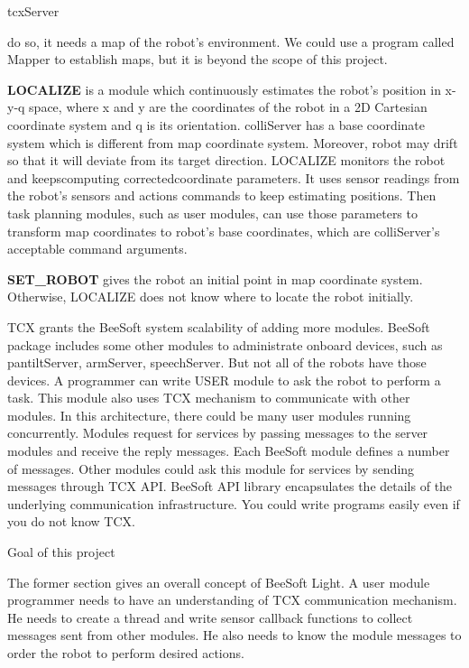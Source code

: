 \begin{itemize}{\bf \item
    tcxServer}
  do so, it needs a map of the robot's environment.  We could use a
  program called Mapper to establish maps, but it is beyond the scope
  of this project.\item {\bf LOCALIZE }is a module which continuously
  estimates the robot's position in x-y-q space, where x and y are the
  coordinates of the robot in a 2D Cartesian coordinate system and q
  is its orientation. colliServer has a base coordinate system which
  is different from map coordinate system. Moreover, robot may drift
  so that it will deviate from its target direction. LOCALIZE monitors
  the robot and keeps{\bf }computing corrected{\bf }coordinate
  parameters. It uses sensor readings from the robot's sensors and
  actions commands to keep estimating positions. Then task planning
  modules, such as user modules, can use those parameters to transform
  map coordinates to robot's base coordinates, which are colliServer's
  acceptable command arguments.  \item {\bf SET\_ROBOT }gives the
  robot an initial point in map coordinate system. Otherwise, LOCALIZE
  does not know where to locate the robot initially.
\end{itemize}\par TCX grants the BeeSoft system scalability of adding
more modules. BeeSoft package includes some other modules to
administrate onboard devices, such as pantiltServer, armServer,
speechServer. But not all of the robots have those devices. A
programmer can write USER module to ask the robot to perform a task.
This module also uses TCX mechanism to communicate with other modules.
In this architecture, there could be many user modules running
concurrently. Modules request for services by passing messages to the
server modules and receive the reply messages. Each BeeSoft module
defines a number of messages. Other modules could ask this module for
services by sending messages through TCX API. BeeSoft API library
encapsulates the details of the underlying communication
infrastructure. You could write programs easily even if you do not
know TCX.\par \par Goal of this project\par \par The former section
gives an overall concept of BeeSoft Light. A user module programmer
needs to have an understanding of TCX communication mechanism. He
needs to create a thread and write sensor callback functions to
collect messages sent from other modules. He also needs to know the
module messages to order the robot to perform desired actions.\par
